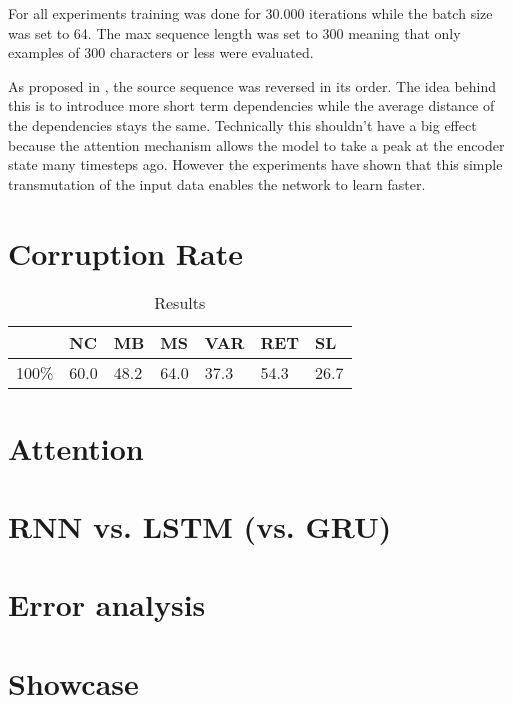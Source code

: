 For all experiments training was done for 30.000 iterations while the batch size was set to 64. The max sequence length was set to 300 meaning that only examples of 300 characters or less were evaluated.

As proposed in \cite{seq2seq}, the source sequence was reversed in its order. The idea behind this is to introduce more short term dependencies while the average distance of the dependencies stays the same. Technically this shouldn't have a big effect because the attention mechanism allows the model to take a peak at the encoder state many timesteps ago. However the experiments have shown that this simple transmutation of the input data enables the network to learn faster.

\section{Corruption Rate}

\begin{table}[h]
\begin{tabular}{ | m{2cm} | m{1cm} | m{1cm} | m{1cm} | m{1cm} | m{1cm} | m{1cm} | }
  \hline
  & NC & MB & MS & VAR & RET & SL \\
  \hline
  \hline
  100\% & 60.0 & 48.2 & 64.0 & 37.3 & 54.3 & 26.7 \\
  \hline
\end{tabular}
\caption{Results}
\label{result_table}
\end{table}

\section{Attention}

\section{RNN vs. LSTM (vs. GRU)}

\section{Error analysis}

\section{Showcase}

